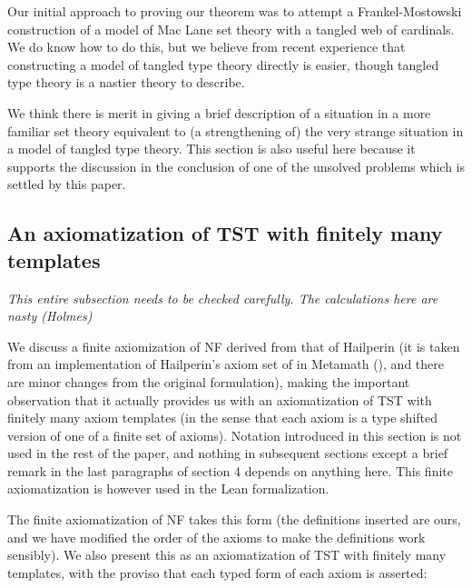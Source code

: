 \documentclass[112pt]{article}
\theoremstyle{definition}
\theoremstyle{remark}
\newcommand{\rk}[1]{{\color{blue}\sl #1}}
\begin{document}
Our initial approach to proving our theorem was to attempt a Frankel-Mostowski construction of a model of Mac Lane set theory with a tangled web of cardinals.  We do know how to do this, but we believe from recent experience that constructing a model of tangled type theory directly is easier, though tangled type theory is a nastier theory to describe.

We think there is merit in giving a brief description of a situation in a more familiar set theory equivalent to (a strengthening of) the very strange situation in a model of tangled type theory.  This section is also useful here because it supports the discussion in the conclusion of one of the unsolved problems which is settled by this paper.

\newpage

\subsection{An axiomatization of TST with finitely many templates}\label{ss:hailperin}

\rk{This entire subsection needs to be checked carefully.  The calculations here are nasty (Holmes)}


We discuss a finite axiomization of NF derived from that of Hailperin (it is taken from an implementation of Hailperin's axiom set of \cite{hailperin} in Metamath (\cite{metamath}), and there are minor changes from the original formulation), making the important observation that it actually provides us with an axiomatization of TST with finitely many
axiom templates (in the sense that each axiom is a type shifted version of one of a finite set of axioms).  Notation introduced in this section is not used in the rest of the paper, and nothing in subsequent sections except a brief remark in the last paragraphs of section 4 depends on anything here.  This finite axiomatization is however used in the Lean formalization.

The finite axiomatization of NF takes this form (the definitions inserted are ours, and we have modified the order of the axioms to make the definitions work sensibly).  We also present this as an axiomatization of TST with finitely many templates, with the proviso that each typed form of each axiom is asserted:
\end{document}
